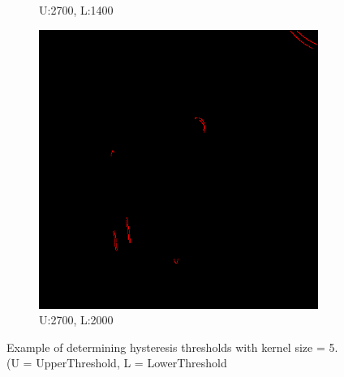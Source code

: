 \documentclass[11pt]{article}
\begin{document}
\begin{figure}[H]
\begin{subfigure}[t]{.25\textwidth}
		\caption{U:2700, L:1400}
	\end{subfigure}
\hfill
	\begin{subfigure}[t]{.25\textwidth}
		\centering
		\includegraphics[scale=0.3]{pics/normalThreshTest/Upper2700lower2000kernel5.png}
		\caption{U:2700, L:2000}
	\end{subfigure}
	
	\caption{Example of determining hysteresis thresholds with kernel size = 5. \\(U = UpperThreshold, L = LowerThreshold}
	\label{fig:hysteresisDetermining}
\end{figure}
\end{document}
